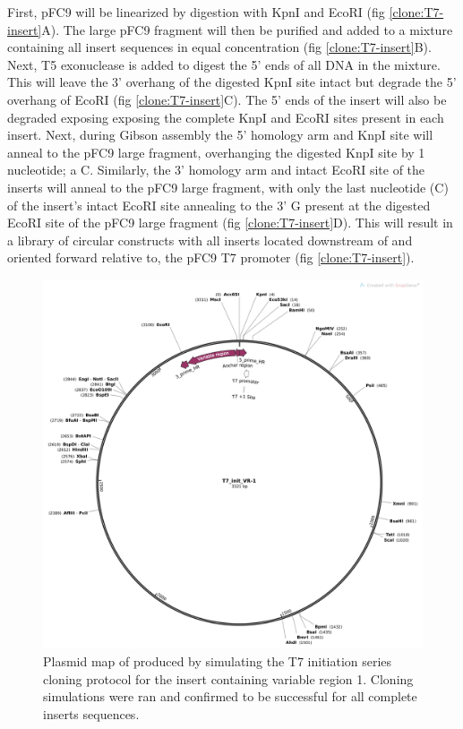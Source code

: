 \documentclass[11pt]{article}
\begin{document}
First, pFC9 will be linearized by digestion with KpnI and EcoRI  (fig \ref{clone:T7-insert}A). The large pFC9 fragment will then be purified and added to a mixture containing all insert sequences in equal concentration  (fig \ref{clone:T7-insert}B). Next, T5 exonuclease is added to digest the 5' ends of all DNA in the mixture. This will leave the 3' overhang of the digested KpnI site intact but degrade the 5' overhang of EcoRI  (fig \ref{clone:T7-insert}C). The 5' ends of the insert will also be degraded exposing exposing the complete KnpI and EcoRI sites present in each insert. Next, during Gibson assembly the 5' homology arm and KnpI site will anneal to the pFC9 large fragment, overhanging the digested KnpI site by 1 nucleotide; a C. Similarly, the 3' homology arm and intact EcoRI site of the inserts will anneal to the pFC9 large fragment, with only the last nucleotide (C) of the insert's intact EcoRI site annealing to the 3' G present at the digested EcoRI site of the pFC9 large fragment (fig \ref{clone:T7-insert}D). This will result in a library of circular constructs with all inserts located downstream of and oriented forward relative to, the pFC9 T7 promoter (fig \ref{clone:T7-insert}). 

\begin{figure}[H]
	\includegraphics[width=12cm]{images/plasmid_maps/T7_init_vr-1_simulated_assembly.png}
	\centering
	\caption{Plasmid map of produced by simulating the T7 initiation series cloning protocol for the insert containing variable region 1. Cloning simulations were ran and confirmed to be successful for all complete inserts sequences.}
	\label{clone:T7-insert-simulated}
\end{figure}
\end{document}
